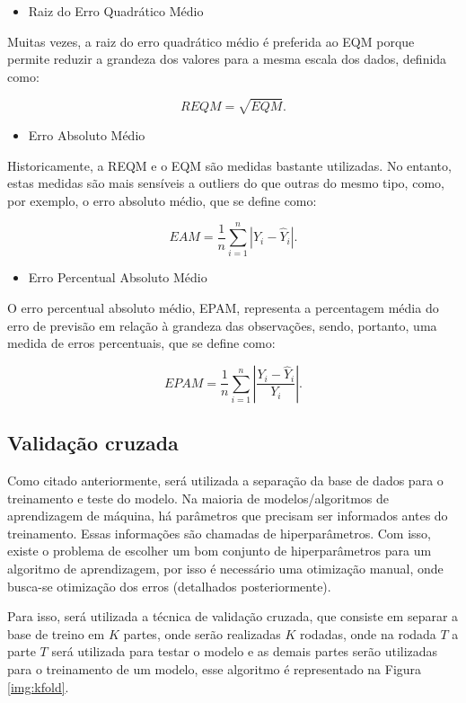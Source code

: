 \documentclass[
	12pt,				%
	a4paper,		%
	oneside,    %
	chapter=TITLE,		   %
	section=TITLE,		   %
	subsection=TITLE,	   %
	subsubsection=TITLE, %
	english,			%
	french,				%
	spanish,			%
	brazil,				%
]{abntex2}
\providecommand{\tightlist}{%
	\setlength{\itemsep}{0pt}\setlength{\parskip}{0pt}}
\begin{document}
\begin{itemize}
\tightlist
\item
  Raiz do Erro Quadrático Médio
\end{itemize}

Muitas vezes, a raiz do erro quadrático médio é preferida ao EQM porque
permite reduzir a grandeza dos valores para a mesma escala dos dados,
definida como:

\[REQM = \sqrt{EQM}.\]

\begin{itemize}
\tightlist
\item
  Erro Absoluto Médio
\end{itemize}

Historicamente, a REQM e o EQM são medidas bastante utilizadas. No
entanto, estas medidas são mais sensíveis a outliers do que outras do
mesmo tipo, como, por exemplo, o erro absoluto médio, que se define
como:

\[EAM = \frac{1}{n} \sum_{i=1}^n |Y_i - \hat{Y}_i|.\]

\begin{itemize}
\tightlist
\item
  Erro Percentual Absoluto Médio
\end{itemize}

O erro percentual absoluto médio, EPAM, representa a percentagem média
do erro de previsão em relação à grandeza das observações, sendo,
portanto, uma medida de erros percentuais, que se define como:

\[EPAM =  \frac{1}{n} \sum_{i=1}^n \left| \frac{Y_i - \hat{Y}_i}{Y_i} \right|.\]

\hypertarget{validauxe7uxe3o-cruzada}{%
\subsection{Validação cruzada}\label{validauxe7uxe3o-cruzada}}

Como citado anteriormente, será utilizada a separação da base de dados
para o treinamento e teste do modelo. Na maioria de modelos/algoritmos
de aprendizagem de máquina, há parâmetros que precisam ser informados
antes do treinamento. Essas informações são chamadas de hiperparâmetros.
Com isso, existe o problema de escolher um bom conjunto de
hiperparâmetros para um algoritmo de aprendizagem, por isso é necessário
uma otimização manual, onde busca-se otimização dos erros (detalhados
posteriormente).

Para isso, será utilizada a técnica de validação cruzada, que consiste
em separar a base de treino em \(K\) partes, onde serão realizadas \(K\)
rodadas, onde na rodada \(T\) a parte \(T\) será utilizada para testar o
modelo e as demais partes serão utilizadas para o treinamento de um
modelo, esse algoritmo é representado na Figura \ref{img:kfold}.
\end{document}
